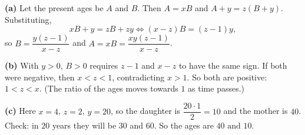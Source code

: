 \textbf{(a)} Let the present ages be $A$ and $B$. Then $A=xB$ and $A+y=z(B+y)$. Substituting,
\[xB+y=zB+zy\iff(x-z)B=(z-1)y,\]
so $B=\dfrac{y(z-1)}{x-z}$ and $A=xB=\dfrac{xy(z-1)}{x-z}$.

\textbf{(b)} With $y>0$, $B>0$ requires $z-1$ and $x-z$ to have the same sign. If both were negative, then $x<z<1$, contradicting $x>1$. So both are positive: $1<z<x$. (The ratio of the ages moves towards $1$ as time passes.)

\textbf{(c)} Here $x=4$, $z=2$, $y=20$, so the daughter is $\dfrac{20\cdot1}{2}=10$ and the mother is $40$. Check: in $20$ years they will be $30$ and $60$. So the ages are $\boxed{40\text{ and }10}$.
